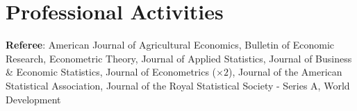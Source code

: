 \documentclass[12pt,letterpaper]{article}
\begin{document}
\section*{Professional Activities}
\textbf{Referee}: American Journal of Agricultural Economics, Bulletin of Economic Research, Econometric Theory, Journal of Applied Statistics, Journal of Business \& Economic Statistics, Journal of Econometrics ($\times 2$), Journal of the American Statistical Association, Journal of the Royal Statistical Society - Series A, World Development 

%
%
%





	
\end{document}

